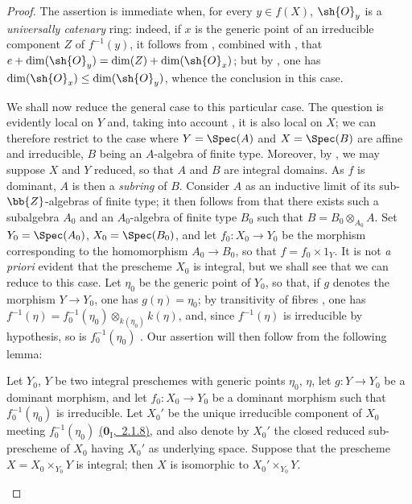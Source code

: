 \begin{proof}
The assertion is immediate when, for every $y\in f(X)$, $\sh{O}_y$ is a \emph{universally catenary} ring: indeed, if $x$ is the generic point of an irreducible component $Z$ of $f^{-1}(y)$, it follows from , combined with , that $e+\dim(\sh{O}_y)=\dim(Z)+\dim(\sh{O}_x)$; but by , one has $\dim(\sh{O}_x)\leq\dim(\sh{O}_y)$, whence the conclusion in this case.

We shall now reduce the general case to this particular case.
The question is evidently local on $Y$ and, taking into account , it is also local on $X$; we can therefore restrict to the case where $Y=\Spec(A)$ and $X=\Spec(B)$ are affine and irreducible, $B$ being an $A$-algebra of finite type.
Moreover, by , we may suppose $X$ and $Y$ reduced, so that $A$ and $B$ are integral domains.
As $f$ is dominant, $A$ is then a \emph{subring} of $B$.
Consider $A$ as an inductive limit of its sub-$\bb{Z}$-algebras of finite type; it then follows from  that there exists such a subalgebra $A_0$ and an $A_0$-algebra of finite type $B_0$ such that $B=B_0\otimes_{A_0}A$.
Set $Y_0=\Spec(A_0)$, $X_0=\Spec(B_0)$, and let $f_0:X_0\to Y_0$ be the morphism corresponding to the homomorphism $A_0\to B_0$, so that $f=f_0\times 1_Y$.
It is not \emph{a priori} evident that the prescheme $X_0$ is integral, but we shall see that we can reduce to this case.
Let $\eta_0$ be the generic point of $Y_0$, so that, if $g$ denotes the morphism $Y\to Y_0$, one has $g(\eta)=\eta_0$; by transitivity of fibres , one has $f^{-1}(\eta)=f_0^{-1}(\eta_0)\otimes_{k(\eta_0)}k(\eta)$, and, since $f^{-1}(\eta)$ is irreducible by hypothesis, so is $f_0^{-1}(\eta_0)$ .
Our assertion will then follow from the following lemma:

\begin{lemma}[13.1.2]
\label{IV.13.1.2}
Let $Y_0$, $Y$ be two integral preschemes with generic points $\eta_0$, $\eta$, let $g:Y\to Y_0$ be a dominant morphism, and let $f_0:X_0\to Y_0$ be a dominant morphism such that $f_0^{-1}(\eta_0)$ is irreducible.
Let $X_0'$ be the unique irreducible component of $X_0$ meeting $f_0^{-1}(\eta_0)$ \hyperref[0.2.1.8]{($\mathbf{0}_{\mathrm{I}}$,~2.1.8)}, and also denote by $X_0'$ the closed reduced sub-prescheme of $X_0$ having $X_0'$ as underlying space.
Suppose that the prescheme $X=X_0\times_{Y_0}Y$ is integral; then $X$ is isomorphic to $X_0'\times_{Y_0}Y$.
\end{lemma}


\end{proof}

